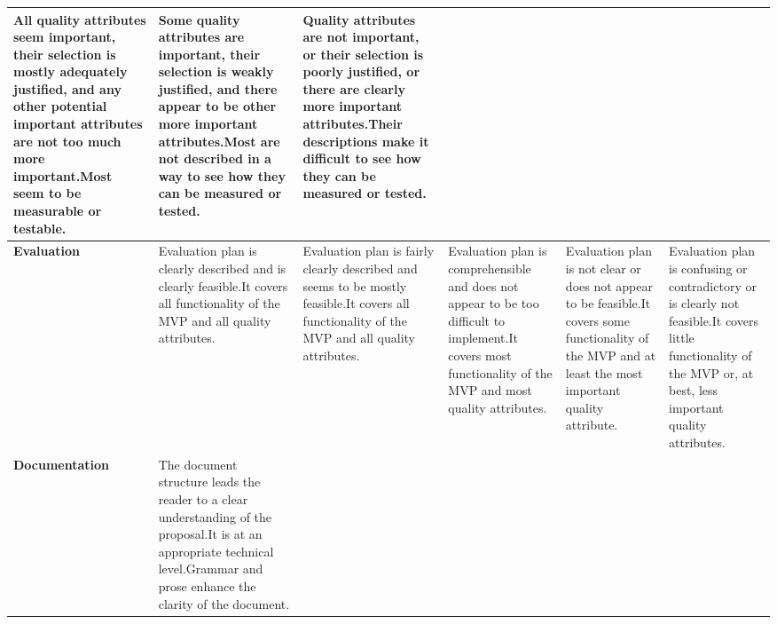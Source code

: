 \documentclass{csse4400}
\begin{document}
\begin{landscape}
\begin{adjustwidth}{-5mm}{-5mm}
\begin{xltabular}{\linewidth}{| p{2cm} | X | X | X | X | X |}
All quality attributes seem important, their selection is mostly adequately justified, and any other potential important attributes are not too much more important.\newline\newline Most seem to be measurable or testable. &
Some quality attributes are important, their selection is weakly justified, and there appear to be other more important attributes.\newline\newline Most are not described in a way to see how they can be measured or tested. &
Quality attributes are not important, or their selection is poorly justified, or there are clearly more important attributes.\newline\newline Their descriptions make it difficult to see how they can be measured or tested. \\
\hline
\textbf{Evaluation} &
Evaluation plan is clearly described and is clearly feasible.\newline\newline It covers all functionality of the MVP and all quality attributes. &
Evaluation plan is fairly clearly described and seems to be mostly feasible.\newline\newline It covers all functionality of the MVP and all quality attributes. &
Evaluation plan is comprehensible and does not appear to be too difficult to implement.\newline\newline It covers most functionality of the MVP and most quality attributes. &
Evaluation plan is not clear or does not appear to be feasible.\newline\newline It covers some functionality of the MVP and at least the most important quality attribute. &
Evaluation plan is confusing or contradictory or is clearly not feasible.\newline\newline It covers little functionality of the MVP or, at best, less important quality attributes. \\
\hline
\textbf{Documentation} &
The document structure leads the reader to a clear understanding of the proposal.\newline\newline It is at an appropriate technical level.\newline\newline Grammar and prose enhance the clarity of the document. &

\end{xltabular}
\end{adjustwidth}
\end{landscape}
\end{document}
